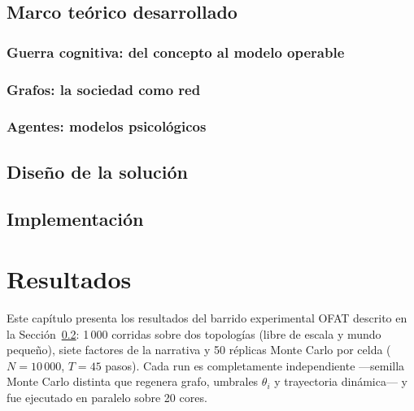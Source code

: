 \documentclass[12pt]{extarticle}
\numberwithin{equation}{section}
\begin{document}
\begin{refsection}
\subsection{Marco te\'orico desarrollado}\label{sec:marco}

\subsubsection{Guerra cognitiva: del concepto al modelo operable}


\subsubsection{Grafos: la sociedad como red}


\subsubsection{Agentes: modelos psicol\'ogicos}


\subsection{Dise\~no de la soluci\'on}\label{sec:diseno}


\subsection{Implementaci\'on}\label{sec:implementacion}



\newpage

\section{Resultados}\label{sec:results}

Este capítulo presenta los resultados del barrido experimental OFAT descrito en la Sección~\ref{sec:diseno}: 1\,000 corridas sobre dos topologías (libre de escala y mundo pequeño), siete factores de la narrativa y 50 réplicas Monte Carlo por celda ($N = 10\,000$, $T = 45$ pasos). Cada run es completamente independiente —semilla Monte Carlo distinta que regenera grafo, umbrales $\theta_i$ y trayectoria dinámica— y fue ejecutado en paralelo sobre 20 cores.


\end{refsection}
\end{document}
